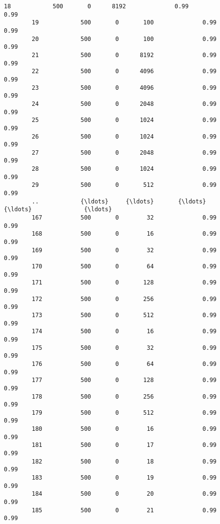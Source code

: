 \documentclass[11pt]{article}
\begin{document}
\begin{Verbatim}[commandchars=\\\{\}]
        18            500       0      8192              0.99              0.99   
        19            500       0       100              0.99              0.99   
        20            500       0       100              0.99              0.99   
        21            500       0      8192              0.99              0.99   
        22            500       0      4096              0.99              0.99   
        23            500       0      4096              0.99              0.99   
        24            500       0      2048              0.99              0.99   
        25            500       0      1024              0.99              0.99   
        26            500       0      1024              0.99              0.99   
        27            500       0      2048              0.99              0.99   
        28            500       0      1024              0.99              0.99   
        29            500       0       512              0.99              0.99   
        ..            {\ldots}     {\ldots}       {\ldots}               {\ldots}               {\ldots}   
        167           500       0        32              0.99              0.99   
        168           500       0        16              0.99              0.99   
        169           500       0        32              0.99              0.99   
        170           500       0        64              0.99              0.99   
        171           500       0       128              0.99              0.99   
        172           500       0       256              0.99              0.99   
        173           500       0       512              0.99              0.99   
        174           500       0        16              0.99              0.99   
        175           500       0        32              0.99              0.99   
        176           500       0        64              0.99              0.99   
        177           500       0       128              0.99              0.99   
        178           500       0       256              0.99              0.99   
        179           500       0       512              0.99              0.99   
        180           500       0        16              0.99              0.99   
        181           500       0        17              0.99              0.99   
        182           500       0        18              0.99              0.99   
        183           500       0        19              0.99              0.99   
        184           500       0        20              0.99              0.99   
        185           500       0        21              0.99              0.99   

\end{Verbatim}
\end{document}
